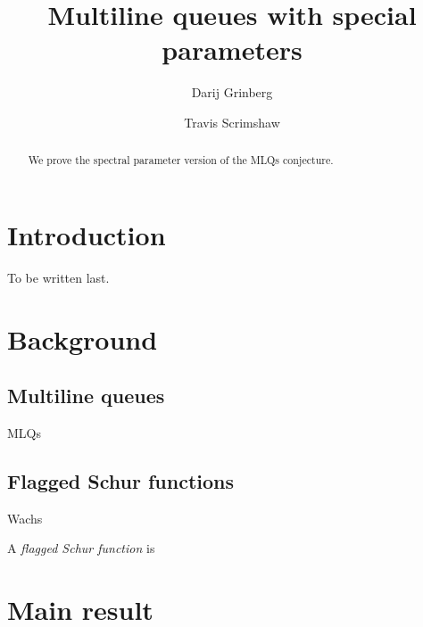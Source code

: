 \documentclass[reqno]{amsart}
\newcommand{\defn}[1]{{\color{darkred}\emph{#1}}} %
\theoremstyle{plain}
\theoremstyle{definition}
\numberwithin{equation}{section}
\begin{document}
\title[MLQs]{Multiline queues with special parameters}

\author[D.~Grinberg]{Darij Grinberg}
\address[D. Grinberg]{School of Mathematics, University of Minnesota, 206 Church St. SE, Minneapolis, MN 55455}

\author[T.~Scrimshaw]{Travis Scrimshaw}



\begin{abstract}
We prove the spectral parameter version of the MLQs conjecture.
\end{abstract}

\maketitle



\section{Introduction}
\label{sec:introduction}

To be written last.






\section{Background}
\label{sec:background}

\subsection{Multiline queues}

MLQs

\subsection{Flagged Schur functions}

Wachs

A \defn{flagged Schur function} is








\section{Main result}
\label{sec:result}









{}
\end{document}
